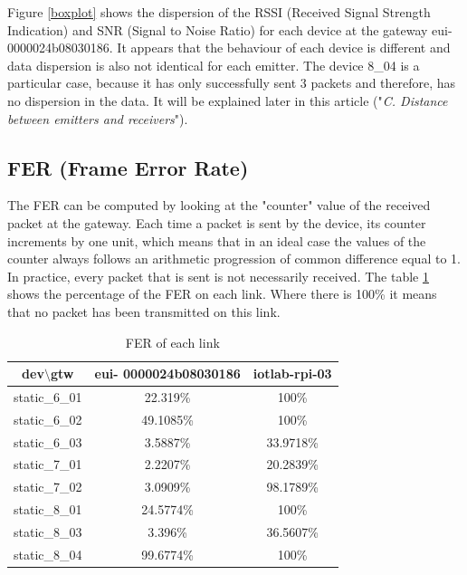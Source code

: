 \documentclass[letterpaper, 10 pt, conference]{ieeeconf}  %
\begin{document}
Figure \ref{boxplot} shows the dispersion of the RSSI (Received Signal Strength Indication) and SNR (Signal to Noise Ratio) for each device at the gateway eui-0000024b08030186. It appears that the behaviour of each device is different and data dispersion is also not identical for each emitter. %
The device 8\_04 is a particular case, because it has only successfully sent 3 packets and therefore, has no dispersion in the data. It will be explained later in this article ("\textit{C. Distance between emitters and receivers}").


\subsection{FER (Frame Error Rate)}

The FER can be computed by looking at the "counter" value of the received packet at the gateway. Each time a packet is sent by the device, its counter increments by one unit, which means that in an ideal case the values of the counter always follows an arithmetic progression of common difference equal to 1. In practice, every packet that is sent is not necessarily received. The table \ref{table_fer} shows the percentage of the FER on each link. Where there is 100\% it means that no packet has been transmitted on this link.

\begin{table}[htbp]
\begin{center} 
\begin{tabular}{|c|c|c|}
  \hline
    dev$\setminus$gtw & eui-
0000024b08030186 & iotlab-rpi-03 \\
  \hline
  static\_6\_01 & 22.319\% & 100\% \\
  \hline
  static\_6\_02 & 49.1085\% & 100\%\\
  \hline
  static\_6\_03 & 3.5887\% & 33.9718\% \\
  \hline
  static\_7\_01 & 2.2207\% & 20.2839\% \\
  \hline
  static\_7\_02 & 3.0909\% & 98.1789\%\\
  \hline
  static\_8\_01 & 24.5774\% & 100\% \\
  \hline
  static\_8\_03 & 3.396\% & 36.5607\% \\
  \hline
  static\_8\_04 & 99.6774\% & 100\% \\
  \hline
  \end{tabular}
  \end{center}
 \caption{FER of each link\label{table_fer}}
\end{table}
\end{document}
